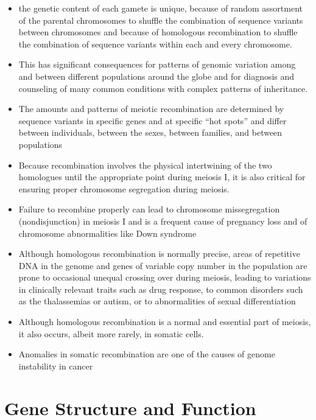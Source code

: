 \documentclass[12pt]{scrartcl}
\begin{document}
\begin{itemize}
\item the genetic content of each gamete is unique, because of random
assortment of the parental chromosomes to shuffle the combination of
sequence variants between chromosomes and because of homologous
recombination to shuffle the combination of sequence variants within
each and every chromosome.
\item This has significant consequences for patterns of genomic variation
among and between different populations around the globe and for
diagnosis and counseling of many common conditions with complex patterns of inheritance.
\item The amounts and patterns of meiotic recombination are determined by
sequence variants in specific genes and at specific “hot spots” and
differ between individuals, between the sexes, between families, and
between populations
\item Because recombination involves the physical intertwining of the two
homologues until the appropriate point during meiosis I, it is also
critical for ensuring proper chromosome segregation during
meiosis.
\item Failure to recombine properly can lead to chromosome missegregation
(nondisjunction) in meiosis I and is a frequent cause of pregnancy
loss and of chromosome abnormalities like Down syndrome
\item Although homologous recombination is normally precise, areas of
repetitive DNA in the genome and genes of variable copy number in
the population are prone to occasional unequal crossing over during
meiosis, leading to variations in clinically relevant traits such as
drug response, to common disorders such as the thalassemias or
autism, or to abnormalities of sexual differentiation
\item Although homologous recombination is a normal and essential part of
meiosis, it also occurs, albeit more rarely, in somatic
cells.
\item Anomalies in somatic recombination are one of the causes of genome
instability in cancer
\end{itemize}

\section{Gene Structure and Function}
\label{sec:org432f616}
\end{document}

